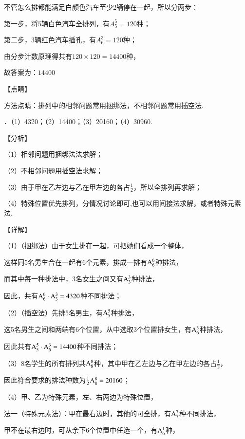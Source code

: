 \documentclass[a4paper,11pt,UTF8,twoside]{ctexart} %
\begin{document}
\noindent 不管怎么排都能满足白颜色汽车至少2辆停在一起，所以分两步：

\noindent 第一步，将5辆白色汽车全排列，有$A_{5}^{5} =120$种；

\noindent 第二步，3辆红色汽车插孔，有$A_{6}^{3} =120$种；

\noindent 由分步计数原理得共有$120\times 120=14400$种，

\noindent 故答案为：$14400$

\noindent 【点睛】

\noindent 方法点睛：排列中的相邻问题常用捆绑法，不相邻问题常用插空法.

．（1）4320；（2）14400；（3）20160；（4）30960.

\noindent 【分析】

\noindent （1）相邻问题用捆绑法法求解；

\noindent （2）不相邻问题用插空法求解；

\noindent （3）由于甲在乙左边与乙在甲左边的各占$\frac{1}{2} $，所以全排列再求解；

\noindent （4）特殊位置优先排列，分情况讨论即可,也可以用间接法求解，或者特殊元素法.

\noindent 【详解】

\noindent （1）（捆绑法）由于女生排在一起，可把她们看成一个整体，

\noindent 这样同5名男生合在一起有6个元素，排成一排有${\rm A}_{6}^{6} $种排法，

\noindent 而其中每一种排法中，3名女生之间又有${\rm A}_{3}^{3} $种排法，

\noindent 因此，共有${\rm A}_{6}^{6} \cdot {\rm A}_{3}^{3} =4320$种不同排法；

\noindent （2）（插空法）先排5名男生，有${\rm A}_{5}^{5} $种排法，

\noindent 这5名男生之间和两端有6个位置，从中选取3个位置排女生，有${\rm A}_{6}^{3} $种排法，

\noindent 因此共有${\rm A}_{5}^{5} \cdot {\rm A}_{6}^{3} =14400$种不同排法；

\noindent （3）8名学生的所有排列共${\rm A}_{8}^{8} $种，其中甲在乙左边与乙在甲左边的各占$\frac{1}{2} $，

\noindent 因此符合要求的排法种数为$\frac{1}{2} {\rm A}_{8}^{8} =20160$；

\noindent （4）甲、乙为特殊元素，左、右两边为特殊位置，

\noindent 法一（特殊元素法）：甲在最右边时，其他的可全排，有${\rm A}_{7}^{7} $种不同排法，

\noindent 甲不在最右边时，可从余下6个位置中任选一个，有${\rm A}_{6}^{1} $种，
\end{document}
